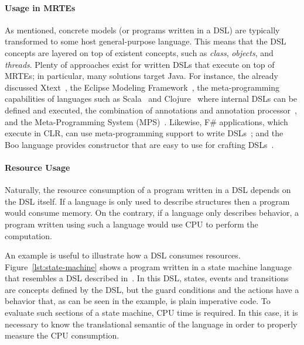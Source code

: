 \paragraph{Usage in MRTEs} As mentioned, concrete models (or programs written in a DSL) are typically transformed to some host general-purpose language. This means that the DSL concepts are layered on top of existent concepts, such as \textit{class}, \textit{objects}, and \textit{threads}.
Plenty of approaches exist for written DSLs that execute on top of MRTEs; in particular, many solutions target Java.
For instance, the already discussed Xtext~\cite{Eysholdt:2010:XIY:1869542.1869625}, the Eclipse Modeling Framework~\cite{EMFModeling}, the meta-programming capabilities of languages such as Scala~\cite{Hofer:2010:MDL:1868294.1868307} and Clojure~\cite{Kelker2013} where internal DSLs can be defined and executed, the combination of annotations and annotation processor~\cite{Huang2008}, and  the Meta-Programming System (MPS)~\cite{JetBrainsMetaProgrammingSystem(MPS),Voelter2014}.
Likewise, F\# applications, which execute in CLR, can use meta-programming support to write DSLs~\cite{Cheney:2013:PTL:2500365.2500586}; and the Boo language provides constructor that are easy to use for crafting DSLs~\cite{Rahien2010}. 

\paragraph{Resource Usage}
Naturally, the resource consumption of a program written in a DSL depends on the DSL itself.
If a language is only used to describe structures then a program would consume memory.
On the contrary, if a language only describes behavior, a program written using such a language would use CPU to perform the computation.

An example is useful to illustrate how a DSL consumes resources.
Figure~\ref{lst:state-machine} shows a program written in a state machine language that resembles a DSL described in~\cite{Voelter2010}.
In this DSL, states, events and transitions are concepts defined by the DSL, but the guard conditions and the actions have a behavior that, as can be seen in the example, is plain imperative code.
To evaluate such sections of a state machine, CPU time is required.
In this case, it is necessary to know the translational semantic of the language in order to properly measure the CPU consumption.


